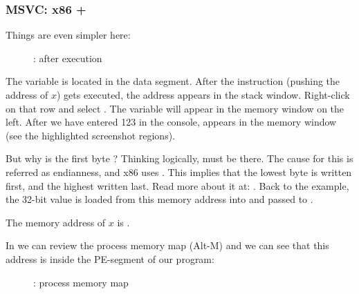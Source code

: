 \clearpage
\subsubsection{MSVC: x86 + \olly}
\myindex{\olly}

Things are even simpler here:

\begin{figure}[H]
\centering
{}
\caption{\olly: after \scanf execution}
\label{fig:scanf_ex2_olly_1}
\end{figure}

The variable is located in the data segment.
After the \PUSH instruction (pushing the address of $x$) gets executed, 
the address appears in the stack window. Right-click on that row and select .
The variable will appear in the memory window on the left.
After we have entered 123 in the console, 
 appears in the memory window (see the highlighted screenshot regions).

But why is the first byte ?
Thinking logically,  must be there.
The cause for this is referred as  \gls{endianness}, and x86 uses .
This implies that the lowest byte is written first, and the highest written last.
Read more about it at: .
Back to the example, the 32-bit value is loaded from this memory address into \EAX and passed to \printf.

The memory address of $x$ is .

\clearpage
In \olly we can review the process memory map (Alt-M)
and we can see that this address is inside the  PE-segment of our program:

\label{olly_memory_map_example}
\begin{figure}[H]
\centering
{}
\caption{\olly: process memory map}
\label{fig:scanf_ex2_olly_2}
\end{figure}

